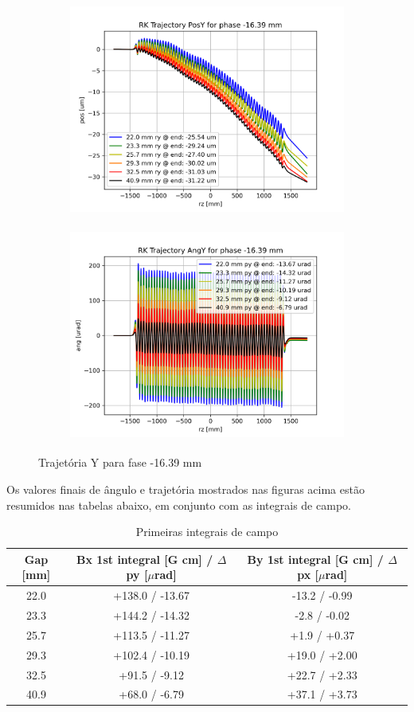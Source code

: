 \documentclass[a4paper,12pt]{article}
\begin{document}
\begin{figure}[H]
\begin{subfigure}{0.5\textwidth}
\includegraphics[width=0.9\linewidth, height=7cm]{figs/phase-16 RK Posy.png} 
\label{fig:subim1-16ty}
\end{subfigure}
\begin{subfigure}{0.5\textwidth}
\includegraphics[width=0.9\linewidth, height=7cm]{figs/phase-16 RK Angy.png}
\label{fig:subim2-16ty}
\end{subfigure}
\caption{Trajetória Y para fase -16.39 mm}
\label{fig:trajy-16}
\end{figure}

Os valores finais de ângulo e trajetória mostrados nas figuras acima estão resumidos nas tabelas abaixo, em conjunto com as integrais de campo.


\begin{table}[H]
\centering
\caption{Primeiras integrais de campo}
\begin{tabular}{|c|c|c|}
\hline
   Gap [mm] & Bx 1st integral [G cm] / $\Delta$ py [$\mu$rad] & By 1st integral [G cm] / $\Delta$ px [$\mu$rad] \\
\hline
    22.0 & +138.0 / -13.67 & -13.2 / -0.99 \\
    23.3 & +144.2 / -14.32 &  -2.8 / -0.02 \\
    25.7 & +113.5 / -11.27 &  +1.9 / +0.37 \\
    29.3 & +102.4 / -10.19 & +19.0 / +2.00 \\
    32.5 & +91.5 / -9.12 & +22.7 / +2.33 \\
    40.9 & +68.0 / -6.79 & +37.1 / +3.73 \\
\hline
\end{tabular}
\end{table}
\end{document}
